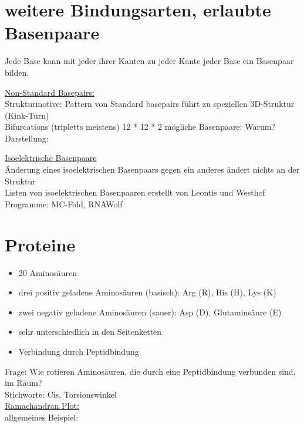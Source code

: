 \section{weitere Bindungsarten, erlaubte Basenpaare}

Jede Base kann mit jeder ihrer Kanten zu jeder Kante jeder Base ein Basenpaar bilden.

\underline{Non-Standard Basepairs:}\\
Strukturmotive: Pattern von Standard basepairs führt zu speziellen 3D-Struktur (Kink-Turn)\\
Bifurcations (tripletts meistens)
12 * 12 * 2 mögliche Basenpaare: Warum?\\

Darstellung:

\underline{Isoelektrische Basenpaare}\\
Änderung eines isoelektrischen Basenpaars gegen ein anderes ändert nichts an der Struktur\\
Listen von isoelektrischen Basenpaaren erstellt von Leontis und Westhof\\


Programme: MC-Fold, RNAWolf\\

\section{Proteine}

\begin{itemize}
	\item 20 Aminosäuren
	\item drei positiv geladene Aminosäuren (basisch): Arg (R), His (H), Lys (K)
	\item zwei negativ geladene Aminosäuren (sauer): Asp (D), Glutaminsäure (E)
	\item sehr unterschiedlich in den Seitenketten
	\item Verbindung durch Peptidbindung
\end{itemize}

Frage: Wie rotieren Aminosäuren, die durch eine Peptidbindung verbunden sind, im Räum?\\
Stichworte: Cis, Torsionswinkel\\

\underline{Ramachandran Plot:}\\
allgemeines Beispiel:

